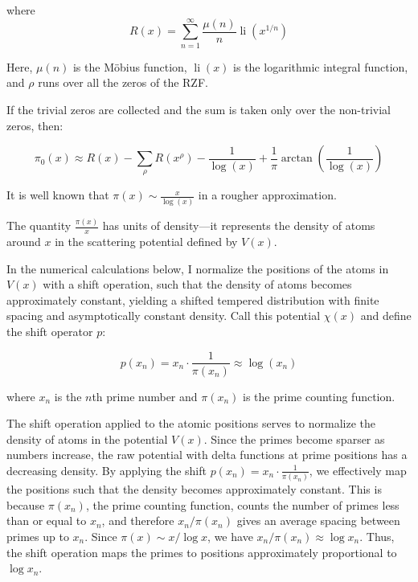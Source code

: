 \documentclass[11pt, oneside]{article}
\begin{document}
where
\begin{equation}
R(x) = \sum_{n=1}^{\infty}\frac{\mu(n)}{n}\operatorname{li}(x^{1/n})
\end{equation}

Here, $\mu(n)$ is the M\"obius function, $\operatorname{li}(x)$ is the logarithmic integral function, and $\rho$ runs over all the zeros of the RZF.

If the trivial zeros are collected and the sum is taken only over the non-trivial zeros, then:

\begin{equation}
\pi_0(x) \approx R(x) - \sum_{\rho}R(x^{\rho}) - \frac{1}{\log(x)} + \frac{1}{\pi}\arctan\left(\frac{1}{\log(x)}\right)
\end{equation}
 
It is well known that $\pi(x) \sim \frac{x}{\log(x)}$ in a rougher approximation.

The quantity $\frac{\pi(x)}{x}$ has units of density---it represents the density of atoms around $x$ in the scattering potential defined by $V(x)$.

In the numerical calculations below, I normalize the positions of the atoms in $V(x)$ with a shift operation, such that the density of atoms becomes approximately constant, yielding a shifted tempered distribution with finite spacing and asymptotically constant density. Call this potential $\chi(x)$ and define the shift operator $p$:

\begin{equation}
p(x_n) = x_n \cdot \frac{1}{\pi(x_n)} \approx \log(x_n)
\end{equation}

where $x_n$ is the $n$th prime number and $\pi(x_n)$ is the prime counting function.

The shift operation applied to the atomic positions serves to normalize the density of atoms in the potential $V(x)$. Since the primes become sparser as numbers increase, the raw potential with delta functions at prime positions has a decreasing density. By applying the shift $p(x_n) = x_n \cdot \frac{1}{\pi(x_n)}$, we effectively map the positions such that the density becomes approximately constant. This is because $\pi(x_n)$, the prime counting function, counts the number of primes less than or equal to $x_n$, and therefore $x_n / \pi(x_n)$ gives an average spacing between primes up to $x_n$. Since $\pi(x) \sim x / \log x$, we have $x_n / \pi(x_n) \approx \log x_n$. Thus, the shift operation maps the primes to positions approximately proportional to $\log x_n$.
\end{document}
